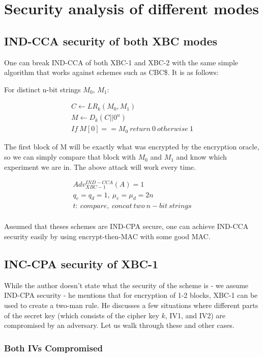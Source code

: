 \documentclass[conference]{IEEEtran}
\begin{document}
\section{Security analysis of different modes}

\subsection{IND-CCA security of both XBC modes}
One can break IND-CCA of both XBC-1 and XBC-2 with the same simple algorithm that works against schemes such as CBC\$. It is as follows:

For distinct n-bit strings $M_0$, $M_1$:

\begin{gather*}
  C \leftarrow LR_k (M_0, M_1) \\
  M \leftarrow D_k (C || 0^n) \\
  If\ M[0] == M_0\ return\ 0\ otherwise\ 1
\end{gather*}

The first block of M will be exactly what was encrypted by the encryption oracle, so we can simply compare that block with $M_0$ and $M_1$ and know which experiment we are in. The above attack will work every time.

\begin{gather*}
  Adv_{XBC-1}^{IND-CCA}(A) = 1 \\
  q_e=q_d=1,\ \mu_e = \mu_d = 2n \\
  t:\ compare,\ concat\ two\ n-bit\ strings \\
\end{gather*}

Assumed that theses schemes are IND-CPA secure, one can achieve IND-CCA security easily by using encrypt-then-MAC with some good MAC.

\subsection{INC-CPA security of XBC-1}

While the author doesn't state what the security of the scheme is  - we assume IND-CPA security - he mentions that for encryption of 1-2 blocks, XBC-1 can be used to create a two-man rule. He discusses a few situations where different parts of the secret key (which consists of the cipher key $k$, IV1, and IV2) are compromised by an adversary. Let us walk through these and other cases. \\

\subsubsection{Both IVs Compromised} \
\label{xbc1-both_IVs}
\end{document}
